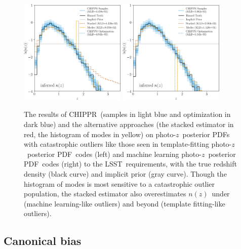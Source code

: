\documentclass[iop]{emulateapj}
\newcommand{\todo}[3]{{\color{#2}\emph{#1}: #3}}
\newcommand{\aim}[1]{\todo{AIM}{red}{#1}}
\newcommand{\project}[1]{\textsc{#1}}
\newcommand{\lsst}{\project{LSST}}
\newcommand{\Chippr}{\project{CHIPPR}}%
\newcommand{\pz}{photo-$z$}
\newcommand{\pzpdf}{\pz\ posterior PDF}%
\newcommand{\nz}{$n(z)$}
\begin{document}
\begin{figure}
	\begin{center}
	\includegraphics[width=0.45\textwidth]{figures/chippr/thesis_eout_log_estimators.png}
	\includegraphics[width=0.45\textwidth]{figures/chippr/thesis_rout_log_estimators.png}
	\caption{
		The results of \Chippr\ (samples in light blue and optimization in dark blue) and the alternative approaches (the stacked estimator in red, the histogram of modes in yellow) on \pzpdf s with catastrophic outliers like those seen in template-fitting \pzpdf\ codes (left) and machine learning \pzpdf\ codes (right) to the \lsst\ requirements, with the true redshift density (black curve) and implicit prior (gray curve).
		Though the histogram of modes is most sensitive to a catastrophic outlier population, the stacked estimator also overestimates \nz\ under (machine learning-like outliers) and beyond (template fitting-like outliers).
	}
	\label{fig:nonuniform-outliers-results}
	\end{center}
\end{figure}

\subsection{Canonical bias}
\label{sec:bias}
\end{document}
